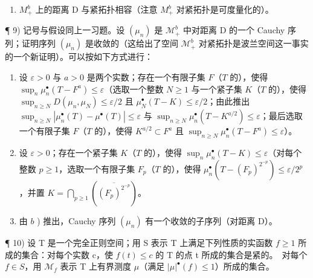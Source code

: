 \begin{enumerate}
\def\labelenumi{\alph{enumi})}
\setcounter{enumi}{4}
\tightlist
\item
  \(M_{+}^{b}\) 上的距离 D 与紧拓扑相容（注意 \(M_{+}^{b}\) 对紧拓扑是可度量化的）。
\end{enumerate}

¶ 9) 记号与假设同上一习题。设 \((\mu_n)\) 是 \(\mathcal{M}_+^b\) 中对距离 D 的一个 Cauchy 序列；证明序列 \((\mu_n)\) 是收敛的（这给出了空间 \(\mathcal{M}_+^b\) 对紧拓扑是波兰空间这一事实的一个新证明）。可以按如下方式进行：

\begin{enumerate}
\def\labelenumi{\alph{enumi})}
\item
  设 \(\varepsilon > 0\) 与 \(a > 0\) 是两个实数；存在一个有限子集 \(F\)（\(T\) 的），使得 \(\sup_{n} \mu_n^\bullet(T - F^a) \leqslant \varepsilon\)（选取一个整数 \(N \geqslant 1\) 与一个紧子集 \(K\)（\(T\) 的），使得 \(\sup_{n \geqslant N} D(\mu_n, \mu_N) \leqslant \varepsilon/2\) 且 \(\mu_N^\bullet(T - K) \leqslant \varepsilon/2\)；由此推出 \(\sup_{n \geqslant N} |\mu_n^\bullet(T) - \mu^\bullet(T)| \leqslant \varepsilon\) 与 \(\sup_{n \geqslant N} \mu_n^\bullet(T - K^{a/2}) \leqslant \varepsilon\)；最后选取一个有限子集 \(F\)（\(T\) 的），使得 \(K^{a/2} \subset F^a\) 且 \(\sup_{n \geqslant N} \mu_n^\bullet(T - F^a) \leqslant \varepsilon\)）。
\item
  设 \(\varepsilon > 0\)；存在一个紧子集 \(K\)（\(T\) 的），使得 \(\sup_{n} \mu_n^\bullet(T - K) \leqslant \varepsilon\)（对每个整数 \(p \geqslant 1\)，选取一个有限子集 \(F_p\)（\(T\) 的），使得 \(\mu_n^\bullet(T - (F_p)^{2^{-p}}) \leqslant \varepsilon / 2^p\)，并置 \(K = \bigcap_{p\geqslant 1}(\overline{(F_p)^{2^{-p}}})\)。
\item
  由 \(b\) ) 推出，Cauchy 序列 \((\mu_n)\) 有一个收敛的子序列（对距离 D）。
\end{enumerate}

¶ 10) 设 T 是一个完全正则空间；用 S 表示 T 上满足下列性质的实函数 \(f \geqslant 1\) 所成的集合：对每个实数 c，使 \(f(t) \leqslant c\) 的 T 的点 t 所成的集合是紧的。~对每个 \(f \in S\)，用 \(\mathcal{M}_f\) 表示 T 上有界测度 \(\mu\)（满足 \(|\mu|^{\bullet}(f) \leqslant 1\)）所成的集合。

